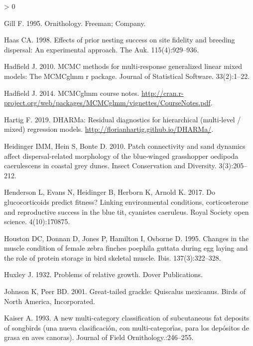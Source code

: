 \documentclass[
]{article}
\newlength{\cslhangindent}
\newenvironment{CSLReferences}[2] %
 {%
  \setlength{\parindent}{0pt}
  \ifodd #1 \everypar{\setlength{\hangindent}{\cslhangindent}}\ignorespaces\fi
  \ifnum #2 > 0
  \setlength{\parskip}{#2\baselineskip}
  \fi
 }%
 {}
\begin{document}
\begin{CSLReferences}{0}{0}
\leavevmode\hypertarget{ref-gill1995ornithology}{}%
Gill F. 1995. Ornithology. Freeman; Company.

\leavevmode\hypertarget{ref-haas1998effects}{}%
Haas CA. 1998. Effects of prior nesting success on site fidelity and
breeding dispersal: An experimental approach. The Auk. 115(4):929--936.

\leavevmode\hypertarget{ref-hadfield2010mcmc}{}%
Hadfield J. 2010. MCMC methods for multi-response generalized linear
mixed models: The MCMCglmm r package. Journal of Statistical Software.
33(2):1--22.

\leavevmode\hypertarget{ref-hadfield2014coursenotes}{}%
Hadfield J. 2014. MCMCglmm course notes.
\url{http://cran.r-project.org/web/packages/MCMCglmm/vignettes/CourseNotes.pdf}.

\leavevmode\hypertarget{ref-Hartig2019dharma}{}%
Hartig F. 2019. DHARMa: Residual diagnostics for hierarchical
(multi-level / mixed) regression models.
\url{http://florianhartig.github.io/DHARMa/}.

\leavevmode\hypertarget{ref-heidinger2010patch}{}%
Heidinger IMM, Hein S, Bonte D. 2010. Patch connectivity and sand
dynamics affect dispersal-related morphology of the blue-winged
grasshopper oedipoda caerulescens in coastal grey dunes. Insect
Conservation and Diversity. 3(3):205--212.

\leavevmode\hypertarget{ref-henderson2017glucocorticoids}{}%
Henderson L, Evans N, Heidinger B, Herborn K, Arnold K. 2017. Do
glucocorticoids predict fitness? Linking environmental conditions,
corticosterone and reproductive success in the blue tit, cyanistes
caeruleus. Royal Society open science. 4(10):170875.

\leavevmode\hypertarget{ref-houston1995changes}{}%
Houston DC, Donnan D, Jones P, Hamilton I, Osborne D. 1995. Changes in
the muscle condition of female zebra finches poephila guttata during egg
laying and the role of protein storage in bird skeletal muscle. Ibis.
137(3):322--328.

\leavevmode\hypertarget{ref-huxley1932problems}{}%
Huxley J. 1932. Problems of relative growth. Dover Publications.

\leavevmode\hypertarget{ref-johnson2001great}{}%
Johnson K, Peer BD. 2001. Great-tailed grackle: Quiscalus mexicanus.
Birds of North America, Incorporated.

\leavevmode\hypertarget{ref-kaiser1993new}{}%
Kaiser A. 1993. A new multi-category classification of subcutaneous fat
deposits of songbirds (una nueva clasificaci{ó}n, con
multi-categor{ı́}as, para los dep{ó}sitos de grasa en aves canoras).
Journal of Field Ornithology.:246--255.


\end{CSLReferences}
\end{document}
